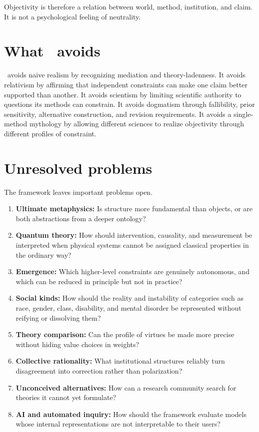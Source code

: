 Objectivity is therefore a relation between world, method, institution, and
claim. It is not a psychological feeling of neutrality.

\section{What \RCR\ avoids}

\RCR\ avoids naive realism by recognizing mediation and theory-ladenness. It
avoids relativism by affirming that independent constraints can make one claim
better supported than another. It avoids scientism by limiting scientific
authority to questions its methods can constrain. It avoids dogmatism through
fallibility, prior sensitivity, alternative construction, and revision
requirements. It avoids a single-method mythology by allowing different
sciences to realize objectivity through different profiles of constraint.

\section{Unresolved problems}

The framework leaves important problems open.

\begin{enumerate}
\item \textbf{Ultimate metaphysics:} Is structure more fundamental than
objects, or are both abstractions from a deeper ontology?
\item \textbf{Quantum theory:} How should intervention, causality, and
measurement be interpreted when physical systems cannot be assigned classical
properties in the ordinary way?
\item \textbf{Emergence:} Which higher-level constraints are genuinely
autonomous, and which can be reduced in principle but not in practice?
\item \textbf{Social kinds:} How should the reality and instability of
categories such as race, gender, class, disability, and mental disorder be
represented without reifying or dissolving them?
\item \textbf{Theory comparison:} Can the profile of virtues be made more
precise without hiding value choices in weights?
\item \textbf{Collective rationality:} What institutional structures reliably
turn disagreement into correction rather than polarization?
\item \textbf{Unconceived alternatives:} How can a research community search for
theories it cannot yet formulate?
\item \textbf{AI and automated inquiry:} How should the framework evaluate models
whose internal representations are not interpretable to their users?
\end{enumerate}

